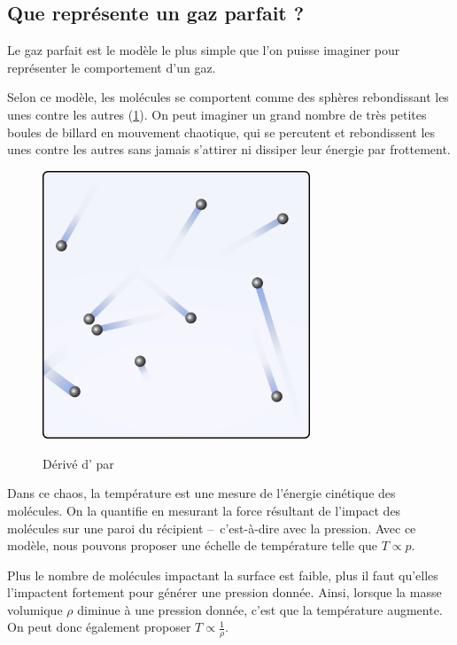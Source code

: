 	\subsection{Que représente un gaz parfait ?}
	\label{ch_gaz_parfait_kezako}

		Le gaz parfait est le modèle le plus simple que l’on puisse imaginer pour représenter le comportement d’un gaz.
		
		Selon ce modèle, les molécules se comportent comme des sphères rebondissant les unes contre les autres (\cref{fig_gaz_boules}). On peut imaginer un grand nombre de très petites boules de billard en mouvement chaotique, qui se percutent et rebondissent les unes contre les autres sans jamais s’attirer ni dissiper leur énergie par frottement.
		
		\begin{figure}
			\begin{center}
				\includegraphics[width=8cm]{images/gaz_boules.png}
			\end{center}
			{Dérivé d’ \ccbysa par }
			\label{fig_gaz_boules}
		\end{figure}
		
		Dans ce chaos, la température est une mesure de l’énergie cinétique des molécules. On la quantifie en mesurant la force résultant de l’impact des molécules sur une paroi du récipient --\ c’est-à-dire avec la pression. Avec ce modèle, nous pouvons proposer une échelle de température telle que $T \propto p$.
		
		Plus le nombre de molécules impactant la surface est faible, plus il faut qu’elles l’impactent fortement pour générer une pression donnée. Ainsi, lorsque la masse volumique $\rho$ diminue à une pression donnée, c’est que la température augmente. On peut donc également proposer $T \propto \frac{1}{\rho}$.
		
